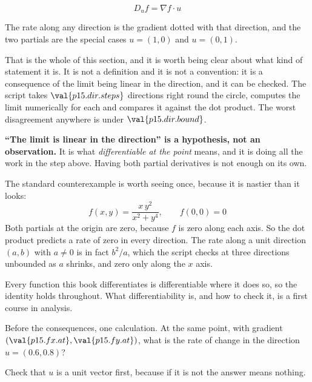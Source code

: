 \begin{fr}
\begin{ansblock}
\[ D_u f = \nabla f \cdot u \]
\end{ansblock}

The rate along any direction is the gradient dotted with that direction, and
the two partials are the special cases $u = (1,0)$ and $u = (0,1)$.

That is the whole of this section, and it is worth being clear about what
kind of statement it is. It is not a definition and it is not a convention:
it is a consequence of the limit being linear in the direction, and it can be
checked. The script takes $\val{p15.dir.steps}$ directions right round the
circle, computes the limit numerically for each and compares it against the
dot product. The worst disagreement anywhere is under
$\val{p15.dir.bound}$.

\begin{rigourbox}
\textbf{\enquote{The limit is linear in the direction} is a hypothesis, not an
observation.} It is what \emph{differentiable at the point} means, and it is
doing all the work in the step above. Having both partial derivatives is not
enough on its own.

The standard counterexample is worth seeing once, because it is nastier than
it looks:
\[ f(x, y) = \frac{x\,y^{2}}{x^{2} + y^{4}}, \qquad f(0, 0) = 0 \]
Both partials at the origin are zero, because $f$ is zero along each axis. So
the dot product predicts a rate of zero in every direction. The rate along a
unit direction $(a, b)$ with $a \neq 0$ is in fact $b^{2}/a$, which the script
checks at three directions \dash{} unbounded as $a$ shrinks, and zero only
along the $x$ axis.

Every function this book differentiates is differentiable where it does so, so
the identity holds throughout. What differentiability is, and how to check it,
is a first course in analysis.
\end{rigourbox}


\end{fr}

\begin{fr}
Before the consequences, one calculation. At the same point, with gradient
$(\val{p15.fx.at}, \val{p15.fy.at})$, what is the rate of change in the
direction $u = (\num{0.6}, \num{0.8})$?

Check that $u$ is a unit vector first, because if it is not the answer means
nothing.
\dotline
\nextframe
\end{fr}

